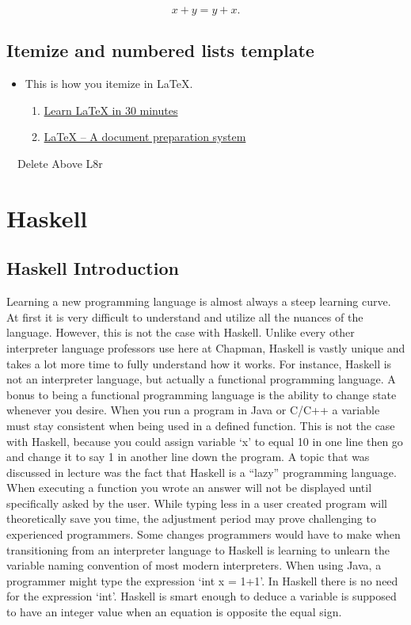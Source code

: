 \documentclass{article}
\begin{document}
    
     $$x+y=y+x.$$
    
    
    \subsection{Itemize and numbered lists template}
    
    \begin{itemize}
    \item This is how you itemize in LaTeX.
    \begin{enumerate}
    \item \href{https://www.overleaf.com/learn/latex/Learn_LaTeX_in_30_minutes}{Learn LaTeX in 30 minutes}
    \item \href{https://www.latex-project.org/}{LaTeX – A document preparation system}\end{enumerate}
    \end{itemize}
    \medskip\noindent
    
    ~~Delete Above L8r~~
    
\section{Haskell}\label{haskell}

    \subsection {Haskell Introduction}
    Learning a new programming language is almost always a steep learning curve. At first it is very difficult to understand and utilize all the nuances of the language. However, this is not the case with Haskell. Unlike every other interpreter language professors use here at Chapman, Haskell is vastly unique and takes a lot more time to fully understand how it works. For instance, Haskell is not an interpreter language, but actually a functional programming language. A bonus to being a functional programming language is the ability to change state whenever you desire. When you run a program in Java or C/C++ a variable must stay consistent when being used in a defined function. This is not the case with Haskell, because you could assign variable ‘x’ to equal 10 in one line then go and change it to say 1 in another line down the program. A topic that was discussed in lecture was the fact that Haskell is a “lazy” programming language. When executing a function you wrote an answer will not be displayed until specifically asked by the user. While typing less in a user created program will theoretically save you time, the adjustment period may prove challenging to experienced programmers. 
    \medskip
    \noindent Some changes programmers would have to make when transitioning from an interpreter language to Haskell is learning to unlearn the variable naming convention of most modern interpreters. When using Java, a programmer might type the expression ‘int x = 1+1’. In Haskell there is no need for the expression ‘int’. Haskell is smart enough to deduce a variable is supposed to have an integer value when an equation is opposite the equal sign.  
    
\end{document}
